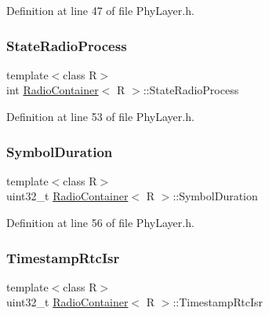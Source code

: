 Definition at line 47 of file Phy\+Layer.\+h.

\mbox{\label{class_radio_container_aaeabc6b1b8012038246bc14e1da1462f}} 
\subsubsection{\texorpdfstring{State\+Radio\+Process}{StateRadioProcess}}
{\footnotesize\ttfamily template$<$class R$>$ \\
int \mbox{\hyperlink{class_radio_container}{Radio\+Container}}$<$ R $>$\+::State\+Radio\+Process}



Definition at line 53 of file Phy\+Layer.\+h.

\mbox{\label{class_radio_container_a26d15cb55aa6f8b4f0bb977f3c4a4b38}} 
\subsubsection{\texorpdfstring{Symbol\+Duration}{SymbolDuration}}
{\footnotesize\ttfamily template$<$class R$>$ \\
uint32\+\_\+t \mbox{\hyperlink{class_radio_container}{Radio\+Container}}$<$ R $>$\+::Symbol\+Duration}



Definition at line 56 of file Phy\+Layer.\+h.

\mbox{\label{class_radio_container_a82ecd21f7fb6701a66037821c6175e44}} 
\subsubsection{\texorpdfstring{Timestamp\+Rtc\+Isr}{TimestampRtcIsr}}
{\footnotesize\ttfamily template$<$class R$>$ \\
uint32\+\_\+t \mbox{\hyperlink{class_radio_container}{Radio\+Container}}$<$ R $>$\+::Timestamp\+Rtc\+Isr}




